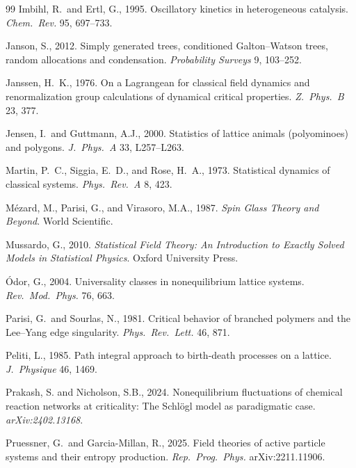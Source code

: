 \documentclass[11pt,a4paper]{article}
\theoremstyle{plain}
\theoremstyle{remark}
\begin{document}
\begin{thebibliography}{99}
Imbihl, R.\ and Ertl, G., 1995. Oscillatory kinetics in heterogeneous catalysis. \textit{Chem.\ Rev.} 95, 697--733.

Janson, S., 2012. Simply generated trees, conditioned Galton--Watson trees, random allocations and condensation. \textit{Probability Surveys} 9, 103--252.

Janssen, H.~K., 1976. On a Lagrangean for classical field dynamics and renormalization group calculations of dynamical critical properties. \textit{Z.\ Phys.\ B} 23, 377.

Jensen, I.\ and Guttmann, A.J., 2000. Statistics of lattice animals (polyominoes) and polygons. \textit{J.\ Phys.\ A} 33, L257--L263.

Martin, P.~C., Siggia, E.~D., and Rose, H.~A., 1973. Statistical dynamics of classical systems. \textit{Phys.\ Rev.\ A} 8, 423.

Mézard, M., Parisi, G., and Virasoro, M.A., 1987. \textit{Spin Glass Theory and Beyond}. World Scientific.

Mussardo, G., 2010. \textit{Statistical Field Theory: An Introduction to Exactly Solved Models in Statistical Physics}. Oxford University Press.

Ódor, G., 2004. Universality classes in nonequilibrium lattice systems. \textit{Rev.\ Mod.\ Phys.} 76, 663.

Parisi, G.\ and Sourlas, N., 1981. Critical behavior of branched polymers and the Lee--Yang edge singularity. \textit{Phys.\ Rev.\ Lett.} 46, 871.

Peliti, L., 1985. Path integral approach to birth-death processes on a lattice. \textit{J.\ Physique} 46, 1469.

Prakash, S. and Nicholson, S.B., 2024. Nonequilibrium fluctuations of chemical reaction networks at criticality: The Schl\"ogl model as paradigmatic case. \textit{arXiv:2402.13168}.

Pruessner, G.\ and Garcia-Millan, R., 2025. Field theories of active particle systems and their entropy production. \textit{Rep.\ Prog.\ Phys.} arXiv:2211.11906.


\end{thebibliography}
\end{document}
